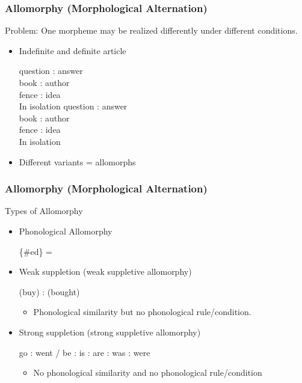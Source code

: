 \documentclass[12pt, table]{beamer}
\begin{document}
\begin{frame}
\frametitle{Allomorphy (Morphological Alternation)}
Problem: One morpheme may be realized differently under different conditions. 
\begin{itemize}
\item Indefinite and definite article
\begin{exe}
\ex	{} question :  answer \\
 book :  author \\
 fence :  idea \\
In isolation 
\ex {} question :  answer \\
 book :  author \\
 fence :  idea \\
In isolation 
\end{exe}
\item Different variants = allomorphs
\end{itemize}
\end{frame}

\begin{frame}
\frametitle{Allomorphy (Morphological Alternation)}
Types of Allomorphy
\begin{itemize}
\item Phonological Allomorphy
\begin{exe}
\ex \{\#ed\} = 
\end{exe}
\item Weak suppletion (weak suppletive allomorphy)
\begin{exe}
\ex {} (buy) :  (bought)
\end{exe}
\begin{itemize}
\item Phonological similarity but no phonological rule/condition.
\end{itemize}
\item Strong suppletion (strong suppletive allomorphy)
\begin{exe}
\ex go : went / be : is : are : was : were
\end{exe}
\begin{itemize}
\item No phonological similarity and no phonological rule/condition
\end{itemize}
\end{itemize}
\end{frame}
\end{document}
